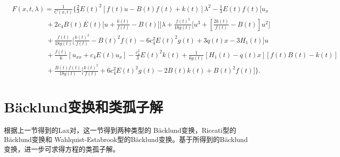 \begin{align}
 \nonumber
&F(x,t,\lambda )=\frac{1}{ C(x,t)}
\Big\{\frac{2}{3} E(t)^2 [f(t)u-B(t)f(t) +k(t)] \lambda ^2 -\frac{1}{3} E(t) f(t)\Big[  u_x
\\ \nonumber
&\quad \quad\quad  \quad\quad
+2 c_4  B(t) E(t) \big[u +\frac{k(t)}{f(t)}-B(t)\big]
\Big]\lambda
+\frac{f(t)^2}{18g(t)}\big[u^3 +  [\frac{2k(t)}{f(t)}-B(t)]u^2\big]
\\ \nonumber
&\quad \quad\quad  \quad\quad
+\frac{f(t)}{18g(t)}\big[\frac{k(t)^2}{f(t)} -B(t)^2 f(t)
-6 c_4^2  E(t)^2 g(t)
+3q(t)x -3H_1(t) \big]u
\\ \nonumber
&\quad \quad\quad  \quad\quad
+ \frac{ f(t)}{6} [ u_{xx}+c_4 E(t) u_x]
-\frac{c_4^2}{3}   E(t)^2 k(t)
+\frac{1}{6g(t)} [H_1(t)-q(t)x ][f(t)B(t)-k(t)]
\\
&\quad \quad\quad  \quad\quad
+ \frac{B(t)f(t)}{18g(t)}\big[ \frac{k(t)^2}{f(t)}+6 c_4^2 E(t)^2  g(t)
-2B(t)k(t)+B(t)^2 f(t)\big]
\Big\}.
\label{mkdv-lp18}
\end{align}

\section{B\"{a}cklund变换和类孤子解}
根据上一节得到的Lax对，这一节得到两种类型的 B\"{a}cklund变换，Riccati型的B\"{a}cklund变换和
Wahlquist-Estabrook型的B\"{a}cklund变换。基于所得到的B\"{a}cklund变换，进一步可求得方程的类孤子解。

